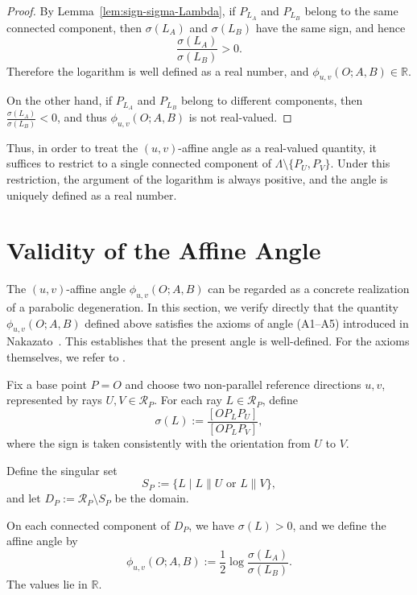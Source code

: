 \documentclass[12pt]{article}
\begin{document}
\begin{proof}
By Lemma~\ref{lem:sign-sigma-Lambda},
if $P_{L_A}$ and $P_{L_B}$ belong to the same connected component,
then $\sigma(L_A)$ and $\sigma(L_B)$ have the same sign,
and hence
\[
\frac{\sigma(L_A)}{\sigma(L_B)}>0.
\]
Therefore the logarithm is well defined as a real number,
and $\phi_{u,v}(O;A,B)\in\mathbb R$.

On the other hand, if $P_{L_A}$ and $P_{L_B}$
belong to different components,
then $\frac{\sigma(L_A)}{\sigma(L_B)}<0$,
and thus $\phi_{u,v}(O;A,B)$ is not real-valued.
\end{proof}


\begin{remark}
Thus, in order to treat the $(u,v)$-affine angle as a real-valued quantity,
it suffices to restrict to a single connected component of
$\Lambda\setminus\{P_U,P_V\}$.
Under this restriction, the argument of the logarithm is always positive,
and the angle is uniquely defined as a real number.
\end{remark}

\section{Validity of the Affine Angle}

The $(u,v)$-affine angle $\phi_{u,v}(O;A,B)$
can be regarded as a concrete realization of a parabolic degeneration.
In this section, we verify directly that the quantity
$\phi_{u,v}(O;A,B)$ defined above satisfies
the axioms of angle (A1--A5) introduced in Nakazato~\cite{Nakazato2025Base1}.
This establishes that the present angle is well-defined.
For the axioms themselves, we refer to \cite{Nakazato2025Base1}.

\begin{definition}
Fix a base point $P=O$ and choose two non-parallel reference directions $u,v$,
represented by rays $U,V\in\mathcal R_P$.
For each ray $L\in\mathcal R_P$, define
\[
\sigma(L):=\frac{[OP_LP_U]}{[OP_LP_V]},
\]
where the sign is taken consistently with the orientation from $U$ to $V$.

Define the singular set
\[
S_P:=\{L \mid L\parallel U \text{ or } L\parallel V\},
\]
and let $D_P:=\mathcal R_P\setminus S_P$ be the domain.

On each connected component of $D_P$, we have $\sigma(L)>0$,
and we define the affine angle by
\[
\phi_{u,v}(O;A,B)
:=
\frac{1}{2}\log\!\frac{\sigma(L_A)}{\sigma(L_B)}.
\]
The values lie in $\mathbb{R}$.
\end{definition}
\end{document}
